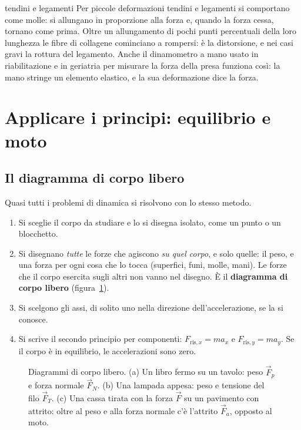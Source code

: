 \begin{applicazione}{tendini e legamenti}
Per piccole deformazioni tendini e legamenti si comportano come molle: si allungano in proporzione alla forza e, quando la forza cessa, tornano come prima. Oltre un allungamento di pochi punti percentuali della loro lunghezza le fibre di collagene cominciano a rompersi: è la distorsione, e nei casi gravi la rottura del legamento. Anche il dinamometro a mano usato in riabilitazione e in geriatria per misurare la forza della presa funziona così: la mano stringe un elemento elastico, e la sua deformazione dice la forza.
\end{applicazione}



\section{Applicare i principi: equilibrio e moto}
\label{sec:ud2-applicazioni}

\subsection{Il diagramma di corpo libero}

Quasi tutti i problemi di dinamica si risolvono con lo stesso metodo.
\begin{enumerate}
  \item Si sceglie il corpo da studiare e lo si disegna isolato, come un punto o un blocchetto.
  \item Si disegnano \emph{tutte} le forze che agiscono \emph{su quel corpo}, e solo quelle: il peso, e una forza per ogni cosa che lo tocca (superfici, funi, molle, mani). Le forze che il corpo esercita sugli altri non vanno nel disegno. È il \textbf{diagramma di corpo libero} (figura~\ref{fig:ud2-corpo-libero}).
  \item Si scelgono gli assi, di solito uno nella direzione dell'accelerazione, se la si conosce.
  \item Si scrive il secondo principio per componenti: $F_{\text{ris},x} = m a_x$ e $F_{\text{ris},y} = m a_y$. Se il corpo è in equilibrio, le accelerazioni sono zero.
\end{enumerate}

\begin{figure}[h]
\centering

\caption{Diagrammi di corpo libero. (a) Un libro fermo su un tavolo: peso $\vec F_p$ e forza normale $\vec F_N$. (b) Una lampada appesa: peso e tensione del filo $\vec F_T$. (c) Una cassa tirata con la forza $\vec F$ su un pavimento con attrito: oltre al peso e alla forza normale c'è l'attrito $\vec F_a$, opposto al moto.}
\label{fig:ud2-corpo-libero}
\end{figure}

